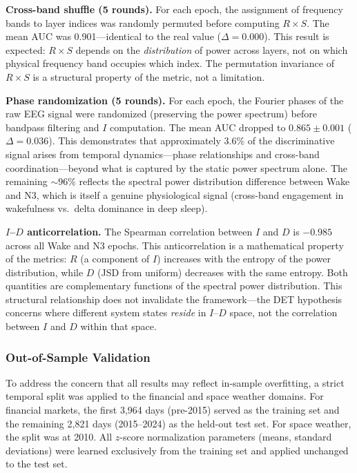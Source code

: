 \documentclass[aip,cha,reprint,amsmath,amssymb]{revtex4-2}
\begin{document}
\textbf{Cross-band shuffle (5 rounds).} For each epoch, the assignment of frequency bands to layer indices was randomly permuted before computing $R \times S$. The mean AUC was 0.901---identical to the real value ($\Delta = 0.000$). This result is expected: $R \times S$ depends on the \emph{distribution} of power across layers, not on which physical frequency band occupies which index. The permutation invariance of $R \times S$ is a structural property of the metric, not a limitation.

\textbf{Phase randomization (5 rounds).} For each epoch, the Fourier phases of the raw EEG signal were randomized (preserving the power spectrum) before bandpass filtering and $I$ computation. The mean AUC dropped to $0.865 \pm 0.001$ ($\Delta = 0.036$). This demonstrates that approximately 3.6\% of the discriminative signal arises from temporal dynamics---phase relationships and cross-band coordination---beyond what is captured by the static power spectrum alone. The remaining ${\sim}96$\% reflects the spectral power distribution difference between Wake and N3, which is itself a genuine physiological signal (cross-band engagement in wakefulness vs.\ delta dominance in deep sleep).

\textbf{$I$--$D$ anticorrelation.} The Spearman correlation between $I$ and $D$ is $-0.985$ across all Wake and N3 epochs. This anticorrelation is a mathematical property of the metrics: $R$ (a component of $I$) increases with the entropy of the power distribution, while $D$ (JSD from uniform) decreases with the same entropy. Both quantities are complementary functions of the spectral power distribution. This structural relationship does not invalidate the framework---the DET hypothesis concerns where different system states \emph{reside} in $I$--$D$ space, not the correlation between $I$ and $D$ within that space.

\subsubsection{Out-of-Sample Validation}

To address the concern that all results may reflect in-sample overfitting, a strict temporal split was applied to the financial and space weather domains. For financial markets, the first 3,964 days (pre-2015) served as the training set and the remaining 2,821 days (2015--2024) as the held-out test set. For space weather, the split was at 2010. All $z$-score normalization parameters (means, standard deviations) were learned exclusively from the training set and applied unchanged to the test set.
\end{document}

